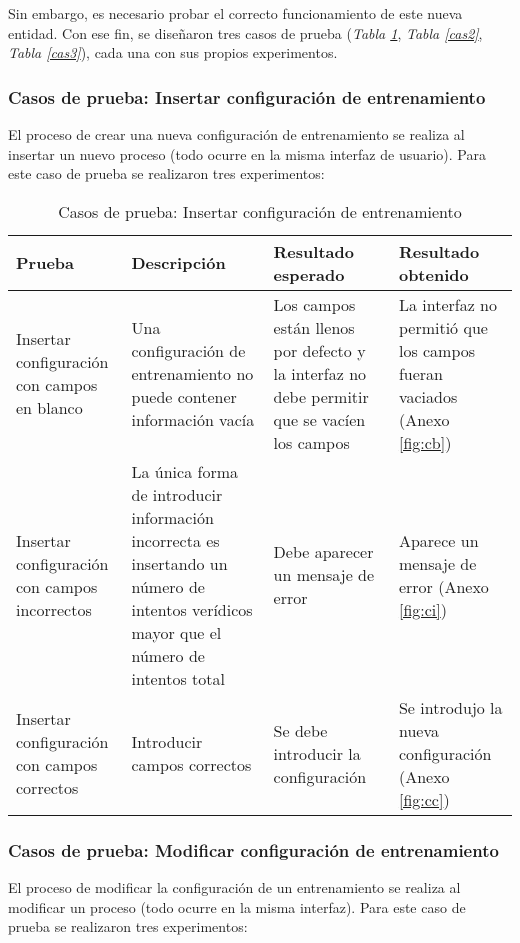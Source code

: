 Sin embargo, es necesario probar el correcto funcionamiento de este nueva entidad. Con ese fin, se diseñaron tres casos de prueba  (\textsl{Tabla \ref{cas1}}, \textsl{Tabla \ref{cas2}}, \textsl{Tabla \ref{cas3}}), cada una con sus propios experimentos. 

\subsubsection{Casos de prueba: Insertar configuración de entrenamiento}
El proceso de crear una nueva configuración de entrenamiento se realiza al insertar un nuevo proceso (todo ocurre en la misma interfaz de usuario). Para este caso de prueba se realizaron tres experimentos:

\begin{table}[H]
\begin{center}
\begin{tabular}{ | p{4cm} | p{3.8cm} | p{3.1cm} | p{3.2cm} |}
\hline
\centering\textbf{Prueba} & \textbf{Descripción} & \textbf{Resultado \break esperado} & \textbf{Resultado \break obtenido} \\
\hline
Insertar configuración con campos en blanco & Una configuración de entrenamiento no puede contener información vacía & Los campos están llenos por defecto y la interfaz no debe permitir que se vacíen los campos & La interfaz no permitió que los campos fueran vaciados (Anexo \ref{fig:cb}) \\
\hline
Insertar configuración con campos incorrectos & La única forma de introducir información incorrecta es insertando un número de intentos verídicos mayor que el número de intentos total & Debe aparecer un mensaje de error & Aparece un mensaje de error (Anexo \ref{fig:ci}) \\
\hline
Insertar configuración con campos correctos & Introducir campos correctos & Se debe introducir la configuración  & Se introdujo la nueva configuración (Anexo \ref{fig:cc}) \\
\hline
\end{tabular}
\caption{Casos de prueba: Insertar configuración de entrenamiento}
\label{cas1}
\end{center}
\end{table}

\subsubsection{Casos de prueba: Modificar configuración de entrenamiento}
El proceso de modificar la configuración de un entrenamiento se realiza al modificar un proceso (todo ocurre en la misma interfaz). Para este caso de prueba se realizaron tres experimentos:

